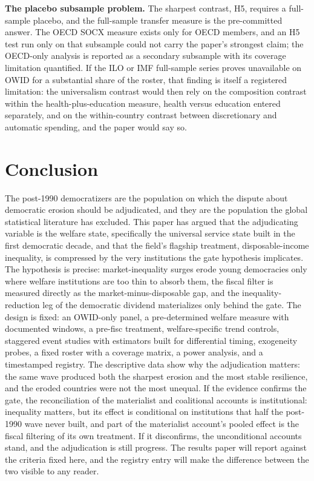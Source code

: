 \textbf{The placebo subsample problem.} The sharpest contrast, H5, requires a full-sample placebo, and the full-sample transfer measure is the pre-committed answer. The OECD SOCX measure exists only for OECD members, and an H5 test run only on that subsample could not carry the paper's strongest claim; the OECD-only analysis is reported as a secondary subsample with its coverage limitation quantified. If the ILO or IMF full-sample series proves unavailable on OWID for a substantial share of the roster, that finding is itself a registered limitation: the universalism contrast would then rely on the composition contrast within the health-plus-education measure, health versus education entered separately, and on the within-country contrast between discretionary and automatic spending, and the paper would say so.

\section{Conclusion}

The post-1990 democratizers are the population on which the dispute about democratic erosion should be adjudicated, and they are the population the global statistical literature has excluded. This paper has argued that the adjudicating variable is the welfare state, specifically the universal service state built in the first democratic decade, and that the field's flagship treatment, disposable-income inequality, is compressed by the very institutions the gate hypothesis implicates. The hypothesis is precise: market-inequality surges erode young democracies only where welfare institutions are too thin to absorb them, the fiscal filter is measured directly as the market-minus-disposable gap, and the inequality-reduction leg of the democratic dividend materializes only behind the gate. The design is fixed: an OWID-only panel, a pre-determined welfare measure with documented windows, a pre-fisc treatment, welfare-specific trend controls, staggered event studies with estimators built for differential timing, exogeneity probes, a fixed roster with a coverage matrix, a power analysis, and a timestamped registry. The descriptive data show why the adjudication matters: the same wave produced both the sharpest erosion and the most stable resilience, and the eroded countries were not the most unequal. If the evidence confirms the gate, the reconciliation of the materialist and coalitional accounts is institutional: inequality matters, but its effect is conditional on institutions that half the post-1990 wave never built, and part of the materialist account's pooled effect is the fiscal filtering of its own treatment. If it disconfirms, the unconditional accounts stand, and the adjudication is still progress. The results paper will report against the criteria fixed here, and the registry entry will make the difference between the two visible to any reader.

